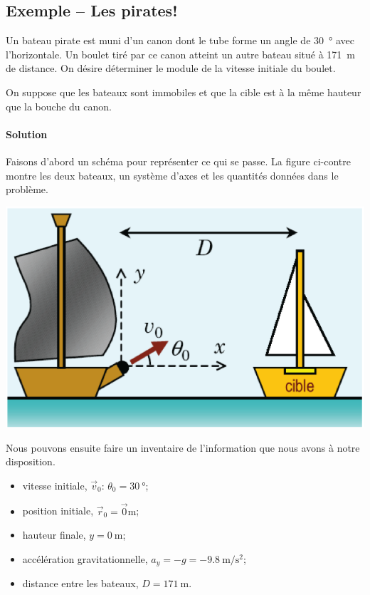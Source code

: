 \subsection{Exemple -- Les pirates!}

Un bateau pirate est muni d'un canon dont le tube forme un angle de
\SI{30}{\degree} avec l'horizontale. Un boulet tiré par ce canon atteint un
autre bateau situé à \SI{171}{\meter} de distance.  On désire déterminer le
module de la vitesse initiale du boulet.

On suppose que les bateaux sont immobiles et que la cible est à la même
hauteur que la bouche du canon.

\paragraph{Solution}

Faisons d'abord un schéma pour représenter ce qui se passe.  La figure
ci-contre montre les deux bateaux, un système d'axes et les quantités données
dans le problème.

\begin{marginfigure}
  \includegraphics[scale=0.6]{03_Cinematique/pirates.png}
\end{marginfigure}

Nous pouvons ensuite faire un inventaire de l'information que nous avons à
notre disposition.

\begin{itemize}
  \item vitesse initiale, $\vec{v}_0$: $\theta_0 = \SI{30}{\degree}$;
  \item position initiale, $\vec{r}_0 = \vec{0}\si{\meter}$;
  \item hauteur finale, $y = \SI{0}{\meter}$;
  \item accélération gravitationnelle, $a_y =
    -g = \SI{-9.8}{\meter\per\second\squared}$;
  \item distance entre les bateaux, $D = \SI{171}{\meter}$.
\end{itemize}

